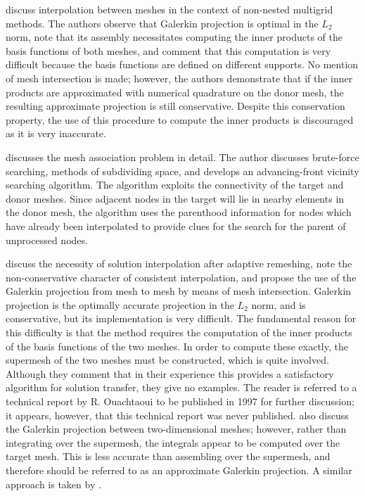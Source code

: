 \citet{peraire1993} discuss interpolation between meshes in the context
of non-nested multigrid methods. The authors observe that Galerkin projection
is optimal in the $L_2$ norm, note that its assembly necessitates computing
the inner products of the basis functions of both meshes, and comment that
this computation is very difficult because the basis functions are defined on different
supports. No mention of mesh intersection is made; however, the authors demonstrate
that if the inner products are approximated with numerical quadrature on the donor
mesh, the resulting approximate projection is still conservative. Despite
this conservation property, the use of this procedure to compute the inner
products is discouraged as it is very inaccurate.

\citet{lohner1995} discusses the mesh association problem in detail.
The author discusses brute-force searching, methods of subdividing
space, and develops an advancing-front vicinity searching algorithm.
The algorithm exploits the connectivity of the target and donor meshes.
Since adjacent nodes in the target will lie in nearby elements in the donor mesh,
the algorithm uses the parenthood information for nodes which have already
been interpolated to provide clues for the search for the parent of unprocessed
nodes.

\citet{george1998} discuss the necessity
of solution interpolation after adaptive remeshing, note the 
non-conservative character of consistent interpolation, and propose  
the use of the Galerkin projection from mesh to mesh by means of 
mesh intersection. Galerkin projection is the optimally accurate
projection in the $L_2$ norm, and is conservative, but its implementation
is very difficult. The fundamental reason for this difficulty is that
the method requires the computation of the inner products of the basis
functions of the two meshes. In order to compute these exactly,
the supermesh of the two meshes must be constructed, which is quite involved.
Although they comment that in their experience
this provides a satisfactory algorithm for solution transfer,
they give no examples. The reader is referred to a technical report
by R. Ouachtaoui to be published in 1997 for further discussion; it appears,
however, that this technical report was never published. \citet{geuzaine1999}
also discuss the Galerkin projection between two-dimensional meshes; however,
rather than integrating over the supermesh, the integrals appear to be
computed over the target mesh.
This is less accurate than assembling over the supermesh,
and therefore should be referred to as an approximate Galerkin projection.
A similar approach is taken by \citet{parent2008}.

